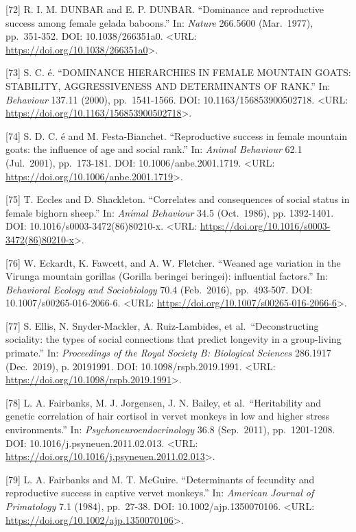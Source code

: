 \documentclass[
]{article}
\begin{document}
{[}72{]} R. I. M. DUNBAR and E. P. DUNBAR. ``Dominance and reproductive
success among female gelada baboons.'' In: \emph{Nature} 266.5600
(Mar.~1977), pp.~351-352. DOI: 10.1038/266351a0. \textless URL:
\url{https://doi.org/10.1038/266351a0}\textgreater.

{[}73{]} S. C. é. ``DOMINANCE HIERARCHIES IN FEMALE MOUNTAIN GOATS:
STABILITY, AGGRESSIVENESS AND DETERMINANTS OF RANK.'' In:
\emph{Behaviour} 137.11 (2000), pp.~1541-1566. DOI:
10.1163/156853900502718. \textless URL:
\url{https://doi.org/10.1163/156853900502718}\textgreater.

{[}74{]} S. D. C. é and M. Festa-Bianchet. ``Reproductive success in
female mountain goats: the influence of age and social rank.'' In:
\emph{Animal Behaviour} 62.1 (Jul.~2001), pp.~173-181. DOI:
10.1006/anbe.2001.1719. \textless URL:
\url{https://doi.org/10.1006/anbe.2001.1719}\textgreater.

{[}75{]} T. Eccles and D. Shackleton. ``Correlates and consequences of
social status in female bighorn sheep.'' In: \emph{Animal Behaviour}
34.5 (Oct.~1986), pp. 1392-1401. DOI: 10.1016/s0003-3472(86)80210-x.
\textless URL:
\url{https://doi.org/10.1016/s0003-3472(86)80210-x}\textgreater.

{[}76{]} W. Eckardt, K. Fawcett, and A. W. Fletcher. ``Weaned age
variation in the Virunga mountain gorillas (Gorilla beringei beringei):
influential factors.'' In: \emph{Behavioral Ecology and Sociobiology}
70.4 (Feb.~2016), pp.~493-507. DOI: 10.1007/s00265-016-2066-6.
\textless URL:
\url{https://doi.org/10.1007/s00265-016-2066-6}\textgreater.

{[}77{]} S. Ellis, N. Snyder-Mackler, A. Ruiz-Lambides, et
al.~``Deconstructing sociality: the types of social connections that
predict longevity in a group-living primate.'' In: \emph{Proceedings of
the Royal Society B: Biological Sciences} 286.1917 (Dec.~2019), p.
20191991. DOI: 10.1098/rspb.2019.1991. \textless URL:
\url{https://doi.org/10.1098/rspb.2019.1991}\textgreater.

{[}78{]} L. A. Fairbanks, M. J. Jorgensen, J. N. Bailey, et
al.~``Heritability and genetic correlation of hair cortisol in vervet
monkeys in low and higher stress environments.'' In:
\emph{Psychoneuroendocrinology} 36.8 (Sep.~2011), pp.~1201-1208. DOI:
10.1016/j.psyneuen.2011.02.013. \textless URL:
\url{https://doi.org/10.1016/j.psyneuen.2011.02.013}\textgreater.

{[}79{]} L. A. Fairbanks and M. T. McGuire. ``Determinants of fecundity
and reproductive success in captive vervet monkeys.'' In: \emph{American
Journal of Primatology} 7.1 (1984), pp.~27-38. DOI:
10.1002/ajp.1350070106. \textless URL:
\url{https://doi.org/10.1002/ajp.1350070106}\textgreater.
\end{document}
